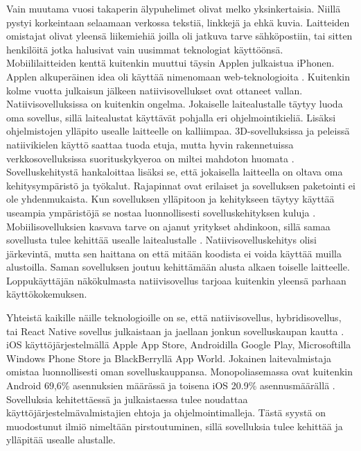 \documentclass{tktltiki}
\begin{document}
Vain muutama vuosi takaperin älypuhelimet olivat melko yksinkertaisia. Niillä pystyi korkeintaan selaamaan verkossa tekstiä, linkkejä ja ehkä kuvia. Laitteiden omistajat olivat yleensä liikemiehiä joilla oli jatkuva tarve sähköpostiin, tai sitten henkilöitä jotka halusivat vain uusimmat teknologiat käyttöönsä. Mobiililaitteiden kenttä kuitenkin muuttui täysin Applen julkaistua iPhonen. Applen alkuperäinen idea oli käyttää nimenomaan web-teknologioita \cite{charland2011mobile}. Kuitenkin kolme vuotta julkaisun jälkeen natiivisovellukset ovat ottaneet vallan. Natiivisovelluksissa on kuitenkin ongelma. Jokaiselle laitealustalle täytyy luoda oma sovellus, sillä laitealustat käyttävät pohjalla eri ohjelmointikieliä. Lisäksi ohjelmistojen ylläpito usealle laitteelle on kalliimpaa. 3D-sovelluksissa ja peleissä natiivikielen käyttö saattaa tuoda etuja, mutta hyvin rakennetuissa verkkosovelluksissa suorituskykyeroa on miltei mahdoton huomata \cite{charland2011mobile}. Sovelluskehitystä hankaloittaa lisäksi se, että jokaisella laitteella on oltava oma kehitysympäristö ja työkalut. Rajapinnat ovat erilaiset ja sovelluksen paketointi ei ole yhdenmukaista. Kun sovelluksen ylläpitoon ja kehitykseen täytyy käyttää useampia ympäristöjä se nostaa luonnollisesti sovelluskehityksen kuluja \cite{xanthopoulos2013comparative}. Mobiilisovelluksien kasvava tarve on ajanut yritykset ahdinkoon, sillä samaa sovellusta tulee kehittää usealle laitealustalle \cite{xanthopoulos2013comparative}. Natiivisovelluskehitys olisi järkevintä, mutta sen haittana on että mitään koodista ei voida käyttää muilla alustoilla. Saman sovelluksen joutuu kehittämään alusta alkaen toiselle laitteelle. Loppukäyttäjän näkökulmasta natiivisovellus tarjoaa kuitenkin yleensä parhaan käyttökokemuksen.

Yhteistä kaikille näille teknologioille on se, että natiivisovellus, hybridisovellus, tai React Native sovellus julkaistaan ja jaellaan jonkun sovelluskaupan kautta \cite{xanthopoulos2013comparative}. iOS käyttöjärjestelmällä Apple App Store, Androidilla Google Play, Microsoftilla Windows Phone Store ja BlackBerryllä App World. Jokainen laitevalmistaja omistaa luonnollisesti oman sovelluskauppansa. Monopoliasemassa ovat kuitenkin Android 69,6\% asennuksien määrässä ja toisena iOS 20.9\% asennusmäärällä \cite{xanthopoulos2013comparative}. Sovelluksia kehitettäessä ja julkaistaessa tulee noudattaa käyttöjärjestelmävalmistajien ehtoja ja ohjelmointimalleja. Tästä syystä on muodostunut ilmiö nimeltään pirstoutuminen, sillä sovelluksia tulee kehittää ja ylläpitää usealle alustalle. 
\end{document}
